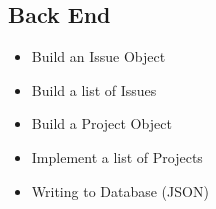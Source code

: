 \documentclass{article}
\begin{document}
    \subsection{Back End}

        \begin{itemize}
            \item Build an Issue Object
            \item Build a list of Issues
            \item Build a Project Object
            \item Implement a list of Projects
            \item Writing to Database (JSON)
        \end{itemize}
\end{document}
